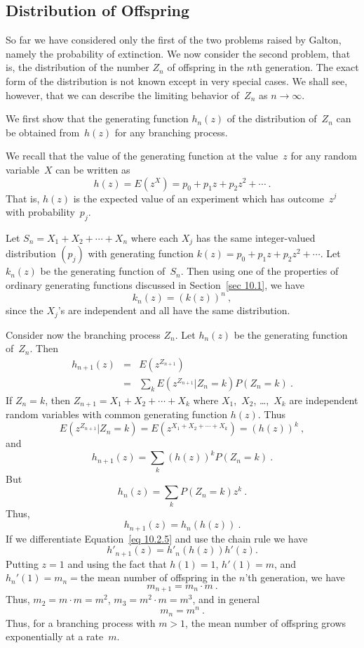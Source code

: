 \subsection*{Distribution of Offspring}
So far we have considered only the first of the two problems raised by Galton,
namely the probability of extinction.  We now consider the second problem, that
is, the distribution of the number $Z_n$ of offspring in the $n$th generation. 
The exact form of the distribution is not known except in very special cases. 
We shall see, however, that we can describe the limiting behavior of~$Z_n$ as
$n \to \infty$.
\par
We first show that the generating function $h_n(z)$ of the distribution
of~$Z_n$ can be obtained from~$h(z)$ for any branching process.
\par
We recall that the value of the generating function at the value~$z$ for any
random variable~$X$ can be written as
$$
h(z) = E(z^X) = p_0 + p_1z + p_2z^2 +\cdots\ .
$$
That is, $h(z)$ is the expected value of an experiment which has outcome~$z^j$
with probability~$p_j$.
\par
Let $S_n = X_1 + X_2 +\cdots+ X_n$ where each
$X_j$ has the same integer-valued distribution $(p_j)$ with generating function
$k(z) = p_0 + p_1z + p_2z^2 +\cdots.$  Let $k_n(z)$ be the generating function
of~$S_n$.  Then using one of the properties of ordinary generating functions 
discussed in Section~\ref{sec 10.1}, we have
$$k_n(z) = (k(z))^n\ ,$$
since the $X_j$'s are independent and all have the same distribution.
\par
Consider now the branching process $Z_n$.  Let $h_n(z)$ be the generating
function of~$Z_n$.  Then
\begin{eqnarray*}
h_{n + 1}(z) &=& E(z^{Z_{n + 1}}) \\
             &=& \sum_k E(z^{Z_{n + 1}} | Z_n = k) P(Z_n = k)\ .
\end{eqnarray*}
If $Z_n = k$, then $Z_{n + 1} = X_1 + X_2 +\cdots+ X_k$ where $X_1$,~$X_2$,
\ldots,~$X_k$ are independent random variables with common generating function
$h(z)$.  Thus
$$
E(z^{Z_{n + 1}} | Z_n = k) = E(z^{X_1 + X_2 +\cdots+ X_k}) = (h(z))^k\ ,
$$
and
$$
h_{n + 1}(z) = \sum_k (h(z))^k P(Z_n = k)\ .
$$
But
$$
h_n(z) = \sum_k P(Z_n = k) z^k\ .
$$
Thus,
\begin{equation}
h_{n + 1}(z) = h_n(h(z))\ . 
\label{eq 10.2.5}
\end{equation}
If we differentiate Equation~\ref{eq 10.2.5} and use the chain rule we have
$$
h'_{n+1}(z) = h'_n(h(z)) h'(z) .
$$
Putting $z = 1$ and using the fact that $h(1) = 1$, $h'(1) = m$, and $h_n'(1) = m_n =
{}$the mean number of offspring in the $n$'th generation, we have
$$
m_{n + 1} = m_n \cdot m\ .
$$
Thus, $m_2 = m \cdot m = m^2$, $m_3 = m^2 \cdot m = m^3$, and in general
$$
m_n = m^n\ .
$$
Thus, for a branching process with $m > 1$, the mean number of offspring grows
exponentially at a rate~$m$.

